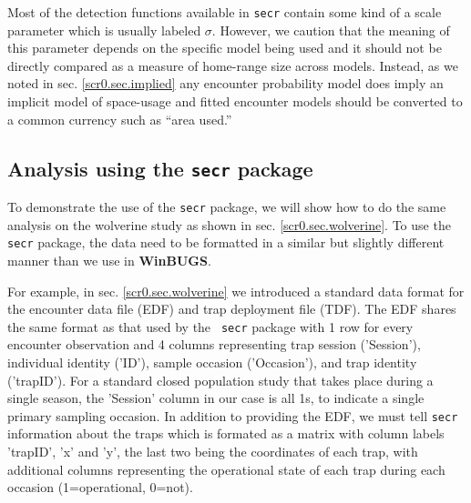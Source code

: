 Most of the detection functions available in \mbox{\tt secr} contain
some kind of a scale parameter which is usually labeled
$\sigma$. However, we caution that the meaning of this parameter
depends on the specific model being used and it should not be directly
compared as a measure of home-range size across models. Instead, as we
noted in sec. \ref{scr0.sec.implied} any encounter probability model
does imply an
implicit model of space-usage and fitted encounter models should be
converted to a common currency such as ``area used.'' 


\subsection{Analysis using the \mbox{\tt secr} package}

To demonstrate the use of the \mbox{\tt secr} package, we will show
how to do the same analysis on the wolverine study as shown in
sec. \ref{scr0.sec.wolverine}. To use the \mbox{\tt secr} package, the
data need to be formatted in a similar but slightly different manner
than we use in {\bf WinBUGS}.

For example, in sec. \ref{scr0.sec.wolverine} we introduced a standard
data format for the encounter data file (EDF) and trap deployment file
(TDF). The EDF shares the same format as that used by the \mbox{\tt
  secr} package with 1 row for every encounter observation and 4 columns representing 
trap session ('Session'), individual identity ('ID'), sample occasion
('Occasion'), and trap identity ('trapID').
For a standard closed population study that takes place during a
single season, the 'Session' column
in our case is all 1s, to indicate a single primary sampling
occasion. 
In addition to providing the EDF,  we must tell \mbox{\tt secr}
information about the traps which is formated as a matrix with column labels
'trapID', 'x' and 'y', the last two being the coordinates of each
trap, with additional columns representing the operational state of
each trap during each occasion (1=operational, 0=not). 

